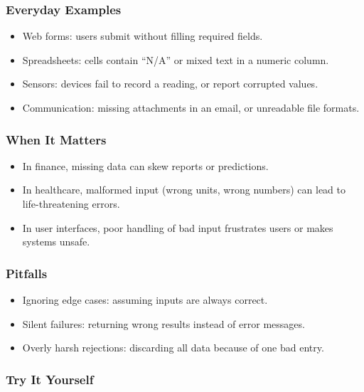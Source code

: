 \documentclass[
  letterpaper,
  DIV=11,
  numbers=noendperiod]{scrreprt}
\providecommand{\tightlist}{%
  \setlength{\itemsep}{0pt}\setlength{\parskip}{0pt}}
\begin{document}
\subsubsection{Everyday Examples}\label{everyday-examples-15}

\begin{itemize}
\tightlist
\item
  Web forms: users submit without filling required fields.
\item
  Spreadsheets: cells contain ``N/A'' or mixed text in a numeric column.
\item
  Sensors: devices fail to record a reading, or report corrupted values.
\item
  Communication: missing attachments in an email, or unreadable file
  formats.
\end{itemize}

\subsubsection{When It Matters}\label{when-it-matters-14}

\begin{itemize}
\tightlist
\item
  In finance, missing data can skew reports or predictions.
\item
  In healthcare, malformed input (wrong units, wrong numbers) can lead
  to life-threatening errors.
\item
  In user interfaces, poor handling of bad input frustrates users or
  makes systems unsafe.
\end{itemize}

\subsubsection{Pitfalls}\label{pitfalls-13}

\begin{itemize}
\tightlist
\item
  Ignoring edge cases: assuming inputs are always correct.
\item
  Silent failures: returning wrong results instead of error messages.
\item
  Overly harsh rejections: discarding all data because of one bad entry.
\end{itemize}

\subsubsection{Try It Yourself}\label{try-it-yourself-16}
\end{document}
